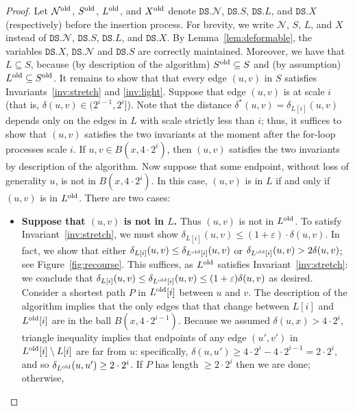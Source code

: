 \documentclass[11pt]{article}
\let\e\varepsilon               %
\newcommand{\cN}{\mathcal{N}}
\newcommand{\dist}{\ensuremath{\delta}}
\newcommand{\DS}{\texttt{DS}}
\newcommand{\points}{{\ensuremath{\DS.X}}}
\newcommand{\sparse}{{\ensuremath{\DS.S}}}
\newcommand{\net}{{\ensuremath{\DS.\cN}}}
\newcommand{\light}{{\ensuremath{\DS.L}}}
\begin{document}
\begin{proof}
Let $\cN^{\rm old}$, $S^{\rm old}$, $L^{\rm old}$, and $X^{\rm old}$ denote $\net$, $\sparse$, $\light$, and $\points$ (respectively) before the insertion process.
For brevity, we write $\cN$, $S$, $L$, and $X$ instead of $\net$, $\sparse$, $\light$, and $\points$.
By Lemma~\ref{lem:deformable}, the variables $\points$, $\net$ and $\sparse$ are correctly maintained.
% 
Moreover, we have that $L \subseteq S$, because (by description of the algorithm) $S^{\rm old} \subseteq S$ and (by assumption) $L^{\rm old} \subseteq S^{\rm old}$.
%
%
    It remains to show that that every edge $(u,v)$ in $S$ satisfies Invariants~\ref{inv:stretch} and \ref{inv:light}.
    Suppose that edge $(u,v)$ is at scale $i$ (that is, $\delta(u,v)\in (2^{i-1},2^{i}]$).
    Note that the distance $\dist^*(u,v) = \dist_{L[i]}(u,v)$ 
    depends only on the edges in $L$ with scale strictly less than $i$; thus, it suffices to show that $(u,v)$ satisfies the two invariants at the moment after the for-loop processes scale $i$.
    If $u,v \in B(x, 4 \cdot 2^i)$, then $(u,v)$ satisfies the two invariants by description of the algorithm. Now suppose that some endpoint, without loss of generality $u$, is not in $B(x, 4 \cdot 2^i)$. In this case, $(u,v)$ is in $L$ if and only if $(u,v)$ is in $L^{\rm old}$. There are two cases:
    \begin{itemize}
        \item \textbf{\boldmath Suppose that $(u,v)$ is not in $L$.} Thus $(u,v)$ is not in $L^{\rm old}$. To satisfy Invariant~\ref{inv:stretch}, we must show $\dist_{L[i]}(u,v) \le (1+\e) \cdot \dist(u,v)$. In fact, we show that either $\dist_{L[i]}(u,v) \le \dist_{L^{\rm old}[i]}(u,v)$ or $\dist_{L^{\rm old}[i]}(u,v) > 2 \dist(u,v)$; see Figure~\ref{fig:recourse}. This suffices, as $L^{\rm old}$ satisfies Invariant~\ref{inv:stretch}: we conclude that $\dist_{L[i]}(u,v) \le \dist_{L^{\rm old}[i]}(u,v) \le (1+\e) \dist(u,v)$ as desired. Consider a shortest path $P$ in $L^{\rm old}[i]$ between $u$ and $v$. 
        The description of the algorithm implies that the only edges that that change between $L[i]$ and $L^{\rm old}[i]$ are in the ball $B(x, 4 \cdot 2^{i-1})$. Because we assumed $\dist(u,x) > 4 \cdot 2^i$, triangle inequality implies that endpoints of any edge $(u',v')$ in $L^{\rm old}[i] \setminus L[i]$ are far from $u$: specifically, $\dist(u,u') \ge 4 \cdot 2^i - 4 \cdot 2^{i-1} = 2 \cdot 2^i$, and so $\dist_{L^{\rm old}}(u,u') \ge 2 \cdot 2^i$.
        If $P$ has length $\ge 2 \cdot 2^i$ then we are done; otherwise,

\end{itemize}
\end{proof}
\end{document}
